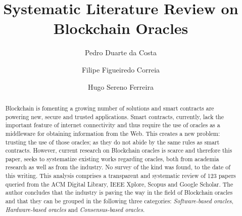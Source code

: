 \documentclass[final,3p,12pt,twocolumn]{elsarticle}
\begin{document}
\begin{frontmatter}




  \title{\textbf{Systematic Literature Review on Blockchain Oracles} }

  \author[add1]{Pedro Duarte da Costa}
  \author[add1,add2]{Filipe Figueiredo Correia}
  \author[add1,add2]{Hugo Sereno Ferreira}

  \address[add1]{Faculty of Engineering, University of Porto, Oporto, Portugal}
  \address[add2]{INESC TEC, Oporto, Portugal}

  \begin{abstract}
    Blockchain is fomenting a growing number of solutions and smart contracts are powering new, secure and trusted applications. Smart contracts, currently, lack the important feature of internet connectivity and thus require the use of oracles as a middleware for obtaining information from the Web. This creates a new problem: trusting the use of those oracles; as they do not abide by the same rules as smart contracts. However, current research on Blockchain oracles is scarce and therefore this paper, seeks to systematize existing works regarding oracles, both from academia research as well as from the industry. No survey of the kind was found, to the date of this writing. This analysis comprises a transparent and systematic review of 123 papers queried from the ACM Digital Library, IEEE Xplore, Scopus and Google Scholar. The author concludes that the industry is paving the way in the field of Blockchain oracles and that they can be grouped in the following three categories: \textit{Software-based oracles}, \textit{Hardware-based oracles} and \textit{Consensus-based  oracles}.


\end{abstract}
\end{frontmatter}
\end{document}
